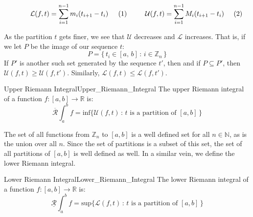 \documentclass[crop=false,class=article]{standalone}                           %
\begin{document}
        \begin{subequations}
            \begin{minipage}[b]{0.49\textwidth}
                \begin{equation}
                    \mathcal{L}(f,t)=\sum_{i=1}^{n-1}m_{i}(t_{i+1}-t_{i})
                \end{equation}
            \end{minipage}
            \hfill
            \begin{minipage}[b]{0.49\textwidth}
                \begin{equation}
                    \mathcal{U}(f,t)=\sum_{i=1}^{n-1}M_{i}(t_{i+1}-t_{i})
                \end{equation}
            \end{minipage}
        \end{subequations}
        \par\vspace{2.5ex}
        As the partition $t$ gets finer, we see that $\mathcal{U}$ decreases
        and $\mathcal{L}$ increases. That is, if we let $P$ be the image of
        our sequence $t$:
        \begin{equation}
            P=\{\,t_{i}\in[a,\,b]\,:\,i\in\mathbb{Z}_{n}\,\}
        \end{equation}
        If $P'$ is another such set generated by the sequence $t'$, then
        and if $P\subseteq{P}'$, then $\mathcal{U}(f,t)\geq\mathcal{U}(f,t')$.
        Similarly, $\mathcal{L}(f,t)\leq\mathcal{L}(f,t')$.
        \begin{fdefinition}{Upper Riemann Integral}{Upper_Riemann_Integral}
            The upper Riemann integral of a function
            $f:[a,b]\rightarrow\mathbb{R}$ is:
            \begin{equation}
                \overline{\mathcal{R}}\int_{a}^{b}f
                =\textrm{inf}\{\mathcal{U}(f,t)\,:\,t
                    \textrm{ is a partition of }[a,b]\,\}
            \end{equation}
        \end{fdefinition}
        The set of all functions from $\mathbb{Z}_{n}$ to $[a,b]$ is a well
        defined set for all $n\in\mathbb{N}$, as is the union over all $n$.
        Since the set of partitions is a subset of this set, the set of all
        partitions of $[a,b]$ is well defined as well. In a similar vein, we
        define the lower Riemann integral.
        \begin{fdefinition}{Lower Riemann Integral}{Lower_Riemann_Integral}
            The lower Riemann integral of a function
            $f:[a,b]\rightarrow\mathbb{R}$ is:
            \begin{equation}
                \underline{\mathcal{R}}\int_{a}^{b}f
                =\textrm{sup}\{\mathcal{L}(f,t)\,:\,t
                    \textrm{ is a partition of }[a,b]\,\}
            \end{equation}
        \end{fdefinition}
\end{document}
